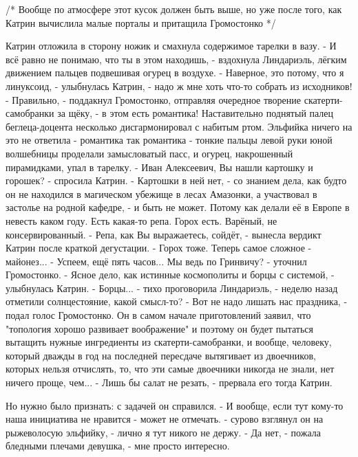 /* Вообще по атмосфере этот кусок должен быть выше, но уже после того, как Катрин вычислила малые порталы и притащила Громостонко */


Катрин отложила в сторону ножик и смахнула содержимое тарелки в вазу.
 - И всё равно не понимаю, что ты в этом находишь, - вздохнула Линдариэль, лёгким движением пальцев подвешивая огурец в воздухе.
 - Наверное, это потому, что я линуксоид, - улыбнулась Катрин, - надо ж мне хоть что-то собрать из исходников!
 - Правильно, - поддакнул Громостонко, отправляя очередное творение скатерти-самобранки за щёку, - в этом есть романтика!
Наставительно поднятый палец беглеца-доцента несколько дисгармонировал с набитым ртом.
Эльфийка ничего на это не ответила - романтика так романтика - тонкие пальцы левой руки юной волшебницы проделали замысловатый пасс, и огурец, накрошенный пирамидками, упал в тарелку.
 - Иван Алексеевич, Вы нашли картошку и горошек? - спросила Катрин.
 - Картошки в ней нет, - со знанием дела, как будто он не находился в магическом убежище в лесах Амазонки, а участвовал в застолье на родной кафедре, - и быть не может. Потому как делали её в Европе в невесть каком году. Есть какая-то репа. Горох есть. Варёный, не консервированный.
 - Репа, как Вы выражаетесь, сойдёт, - вынесла вердикт Катрин после краткой дегустации. - Горох тоже. Теперь самое сложное - майонез...
 - Успеем, ещё пять часов... Мы ведь по Гринвичу? - уточнил Громостонко.
 - Ясное дело, как истинные космополиты и борцы с системой, - улыбнулась Катрин.
 - Борцы... - тихо проговорила Линдариэль, - неделю назад отметили солнцестояние, какой смысл-то?
 - Вот не надо лишать нас праздника, - подал голос Громостонко.
Он в самом начале приготовлений заявил, что "топология хорошо развивает воображение" и поэтому он будет пытаться вытащить нужные ингредиенты из скатерти-самобранки, и вообще, человеку, который дважды в год на последней пересдаче вытягивает из двоечников, которых нельзя отчислять, то, что эти самые двоечники никогда не знали, нет ничего проще, чем...
 - Лишь бы салат не резать, - прервала его тогда Катрин.

Но нужно было признать: с задачей он справился.
 - И вообще, если тут кому-то наша инициатива не нравится - может не отмечать. - сурово взглянул он на рыжеволосую эльфийку, - лично я тут никого не держу.
 - Да нет, - пожала бледными плечами девушка, - мне просто интересно.
